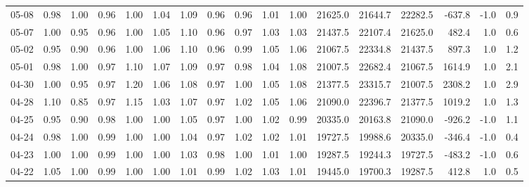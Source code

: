 \begin{threeparttable}
{\begin{tabular}{lrrrrrrrrrrrrrrrr}
  05-08 &   0.98 &   1.00 &         0.96 &     1.00 &           1.04 &        1.09 &        0.96 &        0.96 &          1.01 &          1.00 & 21625.0 & 21644.7 & 22282.5 &     -637.8 &                     -1.0 &                 0.9 \\
  05-07 &   1.00 &   0.95 &         0.96 &     1.00 &           1.05 &        1.10 &        0.96 &        0.97 &          1.03 &          1.03 & 21437.5 & 22107.4 & 21625.0 &      482.4 &                      1.0 &                 0.6 \\
  05-02 &   0.95 &   0.90 &         0.96 &     1.00 &           1.06 &        1.10 &        0.96 &        0.99 &          1.05 &          1.06 & 21067.5 & 22334.8 & 21437.5 &      897.3 &                      1.0 &                 1.2 \\
  05-01 &   0.98 &   1.00 &         0.97 &     1.10 &           1.07 &        1.09 &        0.97 &        0.98 &          1.04 &          1.08 & 21007.5 & 22682.4 & 21067.5 &     1614.9 &                      1.0 &                 2.1 \\
  04-30 &   1.00 &   0.95 &         0.97 &     1.20 &           1.06 &        1.08 &        0.97 &        1.00 &          1.05 &          1.08 & 21377.5 & 23315.7 & 21007.5 &     2308.2 &                      1.0 &                 2.9 \\
  04-28 &   1.10 &   0.85 &         0.97 &     1.15 &           1.03 &        1.07 &        0.97 &        1.02 &          1.05 &          1.06 & 21090.0 & 22396.7 & 21377.5 &     1019.2 &                      1.0 &                 1.3 \\
  04-25 &   0.95 &   0.90 &         0.98 &     1.00 &           1.00 &        1.05 &        0.97 &        1.00 &          1.02 &          0.99 & 20335.0 & 20163.8 & 21090.0 &     -926.2 &                     -1.0 &                 1.1 \\
  04-24 &   0.98 &   1.00 &         0.99 &     1.00 &           1.00 &        1.04 &        0.97 &        1.02 &          1.02 &          1.01 & 19727.5 & 19988.6 & 20335.0 &     -346.4 &                     -1.0 &                 0.4 \\
  04-23 &   1.00 &   1.00 &         0.99 &     1.00 &           1.00 &        1.03 &        0.98 &        1.00 &          1.01 &          1.00 & 19287.5 & 19244.3 & 19727.5 &     -483.2 &                     -1.0 &                 0.6 \\
  04-22 &   1.05 &   1.00 &         0.99 &     1.00 &           1.00 &        1.01 &        0.99 &        1.02 &          1.03 &          1.01 & 19445.0 & 19700.3 & 19287.5 &      412.8 &                      1.0 &                 0.5 \\

\end{tabular}}
\end{threeparttable}
